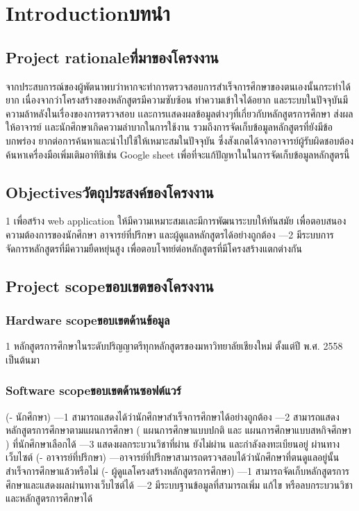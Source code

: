 \chapter{\ifenglish Introduction\else บทนำ\fi}

\section{\ifenglish Project rationale\else ที่มาของโครงงาน\fi}
{จากประสบการณ์ของผู้พัตนาพบว่าหากจะทำการตรวจสอบการสำเร็จการศึกษาของตนเองนั้นกระทำได้ยาก เนื่องจากว่าโครงสร้างของหลักสูตรมีความซับซ้อน ทำความเข้าใจได้อยาก และระบบในปัจจุบันมีความล้าหลังในเรื่องของการตรวจสอบ เเละการเเสดงผลข้อมูลต่างๆที่เกี่ยวกับหลักสูตรการศึกษา ส่งผลให้อาจารย์ เเละนักศึกษาเกิดความลําบากในการใช้งาน รวมถึงการจัดเก็บข้อมูลหลักสูตรที่ยังมีข้อบกพร่อง ยากต่อการค้นหาและนําไปใช้ให้เหมาะสมในปัจจุบัน ซึ่งสังเกตได้จากอาจารย์ผู้รับผิดชอบต้องค้นหาเครื่องมือเพิ่มเติมอาทิชิเช่น Google sheet เพื่อที่จะแก้ปัญหาในในการจัดเก็บข้อมูลหลักสูตรนี้ }


\section{\ifenglish Objectives\else วัตถุประสงค์ของโครงงาน\fi}
{1 เพื่อสร้าง web application ให้มีความเหมาะสมเเละมีการพัฒนาระบบให้ทันสมัย เพื่อตอบสนองความต้องการของนักศึกษา อาจารย์ที่ปรึกษา และผู้ดูแลหลักสูตรได้อย่างถูกต้อง}
{---2 มีระบบการจัดการหลักสูตรที่มีความยืดหยุ่นสูง เพื่อตอบโจทย์ต่อหลักสูตรที่มีโครงสร้างแตกต่างกัน}

\section{\ifenglish Project scope\else ขอบเขตของโครงงาน\fi}

\subsection{\ifenglish Hardware scope\else ขอบเขตด้านข้อมูล\fi}
{1 หลักสูตรการศึกษาในระดับปริญญาตรีทุกหลักสูตรของมหาวิทยาลัยเชียงใหม่ ตั้งแต่ปี พ.ศ. 2558 เป็นต้นมา }
\subsection{\ifenglish Software scope\else ขอบเขตด้านซอฟต์แวร์\fi}
{(- นักศึกษา)}
{---1 สามารถแสดงได้ว่านักศึกษาสำเร็จการศึกษาได้อย่างถูกต้อง}
{---2 สามารถแสดงหลักสูตรการศึกษาตามแผนการศึกษา ( แผนการศึกษาแบบปกติ และ แผนการศึกษาแบบสหกิจศึกษา ) ที่นักศึกษาเลือกได้
}
{---3 แสดงผลกระบวนวิชาที่ผ่าน ยังไม่ผ่าน และกำลังลงทะเบียนอยู่ ผ่านทางเว็บไซต์
}
{(- อาจารย์ที่ปรึกษา)}
{---อาจารย์ที่ปรึกษาสามารถตรวจสอบได้ว่านักศึกษาที่ตนดูแลอยู่นั้นสำเร็จการศึกษาแล้วหรือไม่
}
{(- ผู้ดูแลโครงสร้างหลักสูตรการศึกษา)}
{---1 สามารถจัดเก็บหลักสูตรการศึกษาและแสดงผลผ่านทางเว็บไซต์ได้
}
{---2 มีระบบฐานข้อมูลที่สามารถเพิ่ม แก้ไข หรือลบกระบวนวิชาและหลักสูตรการศึกษาได้
}
